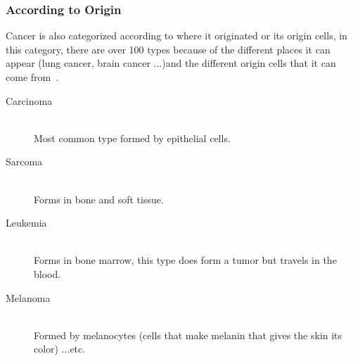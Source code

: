             \subsubsection{According to Origin}
            Cancer is also categorized according to where it originated or its origin cells, in this category, there are over 100 types because of the different places it can appear (lung cancer, brain cancer ...)and the different origin cells that it can come from~\cite{whatiscancer2021}.
            \begin{description}
                \item[Carcinoma] \hfill \\
                Most common type formed by epithelial cells.
                \item[Sarcoma] \hfill \\
                Forms in bone and soft tissue.
                \item[Leukemia] \hfill \\
                Forms in bone marrow, this type does form a tumor but travels in the blood.
                \item[Melanoma] \hfill \\
                Formed by melanocytes (cells that make melanin that gives the skin its color)
                ...etc.
            \end{description}
